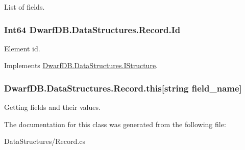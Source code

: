 List of fields. 

\hypertarget{class_dwarf_d_b_1_1_data_structures_1_1_record_a6b9df97308b20ff8504cd88c56aded41}{
\subsubsection[{Id}]{\setlength{\rightskip}{0pt plus 5cm}Int64 DwarfDB.DataStructures.Record.Id}}
\label{class_dwarf_d_b_1_1_data_structures_1_1_record_a6b9df97308b20ff8504cd88c56aded41}


Element id. 



Implements \hyperlink{interface_dwarf_d_b_1_1_data_structures_1_1_i_structure_a20776b8ffebc8d77080ef4b9e9817e85}{DwarfDB.DataStructures.IStructure}.

\hypertarget{class_dwarf_d_b_1_1_data_structures_1_1_record_a303a0895fdeb635fa47469b2ac46c4a3}{
\subsubsection[{this}]{ DwarfDB.DataStructures.Record.this\mbox{[}string field\_\-name\mbox{]}}}
\label{class_dwarf_d_b_1_1_data_structures_1_1_record_a303a0895fdeb635fa47469b2ac46c4a3}


Getting fields and their values. 



The documentation for this class was generated from the following file:\begin{DoxyCompactItemize}
\item 
DataStructures/Record.cs\end{DoxyCompactItemize}
